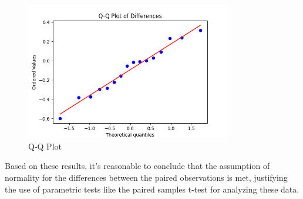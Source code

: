 \documentclass[11pt,a4paper]{report}
\begin{document}
\begin{figure}
  \centering
  \includegraphics[width=0.8\textwidth]{img/qq_plot.png}
  \caption{Q-Q Plot}
  \label{fig:qq_plot}
\end{figure}


Based on these results, it's reasonable to conclude that the assumption of normality for the differences between the paired observations is met, justifying the use of parametric tests like the paired samples t-test for analyzing these data.
\end{document}
